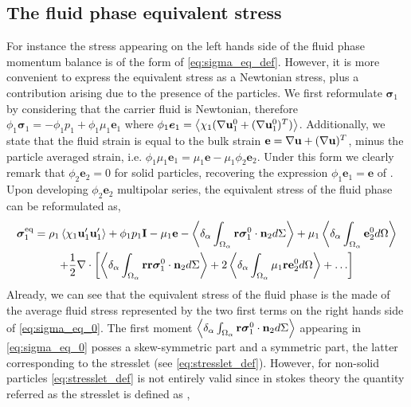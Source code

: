 \subsection{The fluid phase equivalent stress}
For instance the stress appearing on the left hands side of the fluid phase momentum balance is of the form of \ref{eq:sigma_eq_def}. 
However, it is more convenient to express the equivalent stress as a Newtonian stress, plus a contribution arising due to the presence of the particles. 
We first reformulate $\bm{\sigma}_1$ by considering that the carrier fluid is Newtonian, therefore $\phi_1 \bm{\sigma}_1 = - \phi_1 p_1 + \phi_1 \mu_1 \textbf{e}_1$ where $\phi_1 \bm{e}_1 = \left<\chi_1  (\mathbf{\nabla} \textbf{u}_1^0 + (\mathbf{\nabla} \textbf{u}_1^0)^T)\right>$. 
Additionally, we state that the fluid strain is equal to the bulk strain $\textbf{e} = \mathbf{\nabla} \textbf{u}+ (\mathbf{\nabla} \textbf{u})^T$, minus the particle averaged strain, i.e. $\phi_1 \mu_1 \textbf{e}_1 = \mu_1\textbf{e} - \mu_1 \phi_2 \textbf{e}_2$. 
Under this form we clearly remark that $\phi_2 \textbf{e}_2 = 0$ for solid particles, recovering the expression $\phi_1 \textbf{e}_1 = \textbf{e}$ of \citet{jackson1997locally}. 
Upon developing $\phi_2 \textbf{e}_2$ multipolar series, the equivalent stress of the fluid phase can be reformulated as, 
\begin{multline}
    \bm{\sigma}^\text{eq}_1 = 
    \rho_1\left<\chi_1\textbf{u}_1'\textbf{u}_1'\right> 
    + \phi_1 p_1 \textbf{I} 
    - \mu_1 \textbf{e} 
    - \left<\delta_\alpha \int_{\Omega_\alpha} \textbf{r}\bm{\sigma}_1^0\cdot \textbf{n}_2 d\Sigma\right>
    + \mu_1 \left<\delta_\alpha \int_{\Omega_\alpha} \textbf{e}_2^0 d\Omega\right>\\
    + \frac{1}{2} \mathbf{\nabla}\cdot \left[
        \left<\delta_\alpha \int_{\Omega_\alpha} \textbf{rr}\bm{\sigma}_1^0\cdot \textbf{n}_2 d\Sigma\right>
        + 2\left<\delta_\alpha \int_{\Omega_\alpha} \mu_1 \textbf{re}_2^0  d\Omega\right>
        + \ldots
    \right]
    \label{eq:sigma_eq_0}
\end{multline} 
Already, we can see that the equivalent stress of the fluid phase is the made of the average fluid stress represented by the two first terms on the right hands side of \ref{eq:sigma_eq_0}. 
The first moment $\left<\delta_\alpha \int_{\Omega_\alpha} \textbf{r}\bm{\sigma}_1^0 \cdot \textbf{n}_2 d\Sigma\right>$ appearing in \ref{eq:sigma_eq_0} posses a skew-symmetric part and a symmetric part, the latter corresponding to the stresslet (see \ref{eq:stresslet_def}).
However, for non-solid particles \ref{eq:stresslet_def} is not entirely valid since in stokes theory the quantity referred as the stresslet is defined as \citet{pozrikidis1992boundary,kim2013microhydrodynamics},
